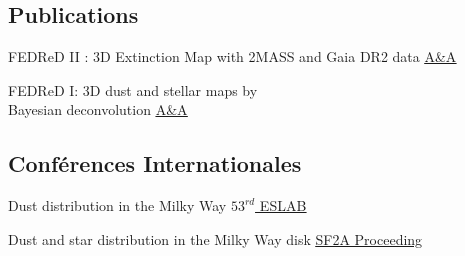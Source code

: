 \documentclass[
 a4paper, 10.5pt,
  sidebarwidth=0.32\paperwidth,
]{fortysecondscv}
\begin{document}
\subsection{Publications}
\begin{cvtable}
  {FEDReD II : 3D Extinction Map with 2MASS and Gaia DR2 data}
  {\href{https://ui.adsabs.harvard.edu/abs/2020arXiv200703734H/abstract}{\underline{A\&A}}}
  {}

  {FEDReD I: 3D dust and stellar maps by \\Bayesian deconvolution}
  {\href{https://ui.adsabs.harvard.edu/abs/2020arXiv200704455B/abstract}{\underline{A\&A}}}
  {}
\end{cvtable}

\subsection{Conférences Internationales}
\begin{cvtable}
  {Dust distribution in the Milky Way}
  {\href{https://ui.adsabs.harvard.edu/abs/2019gaia.confE..55H/abstract}{\underline{$53^{rd}$ ESLAB}}}
  {}

  {Dust and star distribution in the Milky Way disk}
  {\href{https://ui.adsabs.harvard.edu/\#abs/2018sf2a.conf..345H/abstract}{\underline{SF2A Proceeding}}}
  {}
\end{cvtable}




\begin{cvtable}
\end{cvtable}
\end{document}
